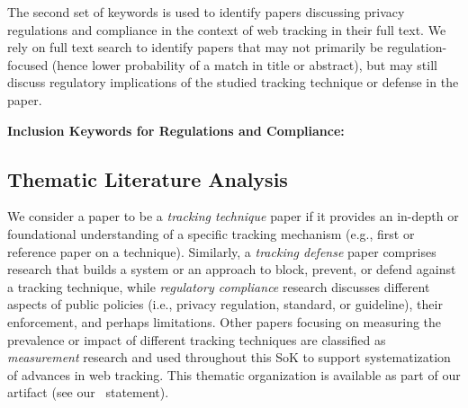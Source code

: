 The second set of keywords is used to identify papers discussing privacy regulations and compliance in the context of web tracking in their full text.
%
We rely on full text search to identify papers that may not primarily be regulation-focused (hence lower probability of a match in title or abstract), but may still discuss regulatory implications of the studied tracking technique or defense in the paper.

\begin{keywordbox}
\textbf{Inclusion Keywords for Regulations and Compliance:}
\end{keywordbox}

\subsection{Thematic Literature Analysis}
\label{sec:thematic-analysis}


We consider a paper to be a \textit{tracking technique} paper if it provides an in-depth or foundational understanding of a specific tracking mechanism (e.g., first or reference paper on a technique).
%
Similarly, a \textit{tracking defense} paper comprises research that builds a system or an approach to block, prevent, or defend against a tracking technique, while \textit{regulatory compliance} research discusses different aspects of public policies (i.e., privacy regulation, standard, or guideline), their enforcement, and perhaps limitations.
%
Other papers focusing on measuring the prevalence or impact of different tracking techniques are classified as \textit{measurement} research and used throughout this SoK to support systematization of advances in web tracking.
%
This thematic organization is available as part of our artifact (see our~ statement).

